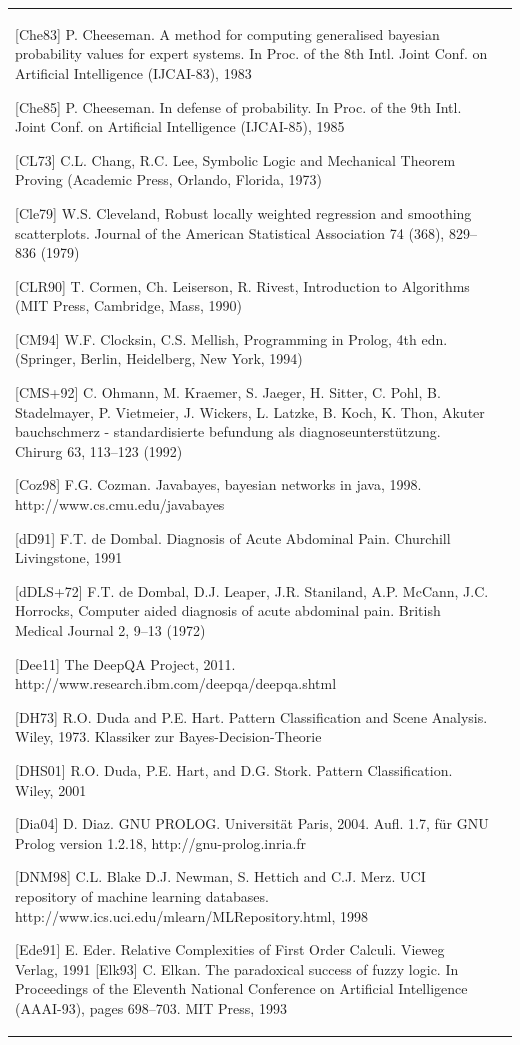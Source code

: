 \documentclass[10pt]{book}
\begin{document}
\begin{tabular}{|l|l|}
[Che83] P. Cheeseman. A method for computing generalised bayesian probability values for expert systems. In Proc. of the 8th Intl. Joint Conf. on Artificial Intelligence (IJCAI-83), 1983

[Che85] P. Cheeseman. In defense of probability. In Proc. of the 9th Intl. Joint Conf. on Artificial Intelligence (IJCAI-85), 1985

[CL73] C.L. Chang, R.C. Lee, Symbolic Logic and Mechanical Theorem Proving (Academic Press, Orlando, Florida, 1973)

[Cle79] W.S. Cleveland, Robust locally weighted regression and smoothing scatterplots. Journal of the American Statistical Association 74 (368), 829–836 (1979)

[CLR90] T. Cormen, Ch. Leiserson, R. Rivest, Introduction to Algorithms (MIT Press, Cambridge, Mass, 1990)

[CM94] W.F. Clocksin, C.S. Mellish, Programming in Prolog, 4th edn. (Springer, Berlin, Heidelberg, New York, 1994)

[CMS+92] C. Ohmann, M. Kraemer, S. Jaeger, H. Sitter, C. Pohl, B. Stadelmayer, P. Vietmeier, J. Wickers, L. Latzke, B. Koch, K. Thon, Akuter bauchschmerz - standardisierte befundung als diagnoseunterstützung. Chirurg 63, 113–123 (1992)

[Coz98] F.G. Cozman. Javabayes, bayesian networks in java, 1998. http://www.cs.cmu.edu/javabayes

[dD91] F.T. de Dombal. Diagnosis of Acute Abdominal Pain. Churchill Livingstone, 1991

[dDLS+72] F.T. de Dombal, D.J. Leaper, J.R. Staniland, A.P. McCann, J.C. Horrocks, Computer aided diagnosis of acute abdominal pain. British Medical Journal 2, 9–13 (1972)

[Dee11] The DeepQA Project, 2011. http://www.research.ibm.com/deepqa/deepqa.shtml

[DH73] R.O. Duda and P.E. Hart. Pattern Classification and Scene Analysis. Wiley, 1973. Klassiker zur Bayes-Decision-Theorie

[DHS01] R.O. Duda, P.E. Hart, and D.G. Stork. Pattern Classification. Wiley, 2001

[Dia04] D. Diaz. GNU PROLOG. Universität Paris, 2004. Aufl. 1.7, für GNU Prolog version 1.2.18, http://gnu-prolog.inria.fr

[DNM98] C.L. Blake D.J. Newman, S. Hettich and C.J. Merz. UCI repository of machine learning databases. http://www.ics.uci.edu/mlearn/MLRepository.html, 1998

[Ede91] E. Eder. Relative Complexities of First Order Calculi. Vieweg Verlag, 1991
[Elk93] C. Elkan. The paradoxical success of fuzzy logic. In Proceedings of the Eleventh National Conference on Artificial Intelligence (AAAI-93), pages 698–703. MIT Press, 1993


\end{tabular}
\end{document}
